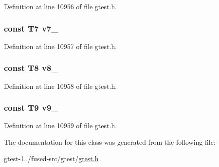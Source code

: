 \-Definition at line 10956 of file gtest.\-h.

\hypertarget{classtesting_1_1internal_1_1ValueArray13_a4063f0b7a528133d018ee488ba44a9a3}{
\subsubsection[{v7\-\_\-}]{\setlength{\rightskip}{0pt plus 5cm}const \-T7 {\bf v7\-\_\-}}}\label{d7/d86/classtesting_1_1internal_1_1ValueArray13_a4063f0b7a528133d018ee488ba44a9a3}


\-Definition at line 10957 of file gtest.\-h.

\hypertarget{classtesting_1_1internal_1_1ValueArray13_a596bc5260b2474271d1f6910ff6f665d}{
\subsubsection[{v8\-\_\-}]{\setlength{\rightskip}{0pt plus 5cm}const \-T8 {\bf v8\-\_\-}}}\label{d7/d86/classtesting_1_1internal_1_1ValueArray13_a596bc5260b2474271d1f6910ff6f665d}


\-Definition at line 10958 of file gtest.\-h.

\hypertarget{classtesting_1_1internal_1_1ValueArray13_a6356e16cf54a9dfac8525f20242af31e}{
\subsubsection[{v9\-\_\-}]{\setlength{\rightskip}{0pt plus 5cm}const \-T9 {\bf v9\-\_\-}}}\label{d7/d86/classtesting_1_1internal_1_1ValueArray13_a6356e16cf54a9dfac8525f20242af31e}


\-Definition at line 10959 of file gtest.\-h.



\-The documentation for this class was generated from the following file\-:\begin{DoxyCompactItemize}
\item 
gtest-\/1../fused-\/src/gtest/\hyperlink{fused-src_2gtest_2gtest_8h}{gtest.\-h}\end{DoxyCompactItemize}
